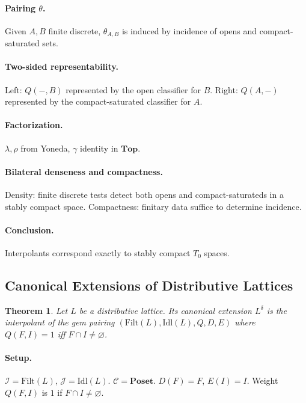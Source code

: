 \documentclass[11pt]{article}
\theoremstyle{plain}
\newtheorem{theorem}{Theorem}[section]
\theoremstyle{definition}
\theoremstyle{remark}
\begin{document}
\paragraph{Pairing $\theta$.}
Given $A,B$ finite discrete, $\theta_{A,B}$ is induced by incidence of opens and compact-saturated sets.

\paragraph{Two-sided representability.}
Left: $Q(-,B)$ represented by the open classifier for $B$.  
Right: $Q(A,-)$ represented by the compact-saturated classifier for $A$.

\paragraph{Factorization.}
$\lambda,\rho$ from Yoneda, $\gamma$ identity in $\mathbf{Top}$.

\paragraph{Bilateral denseness and compactness.}
Density: finite discrete tests detect both opens and compact-saturateds in a stably compact space.  
Compactness: finitary data suffice to determine incidence.

\paragraph{Conclusion.}
Interpolants correspond exactly to stably compact $T_{0}$ spaces.

\subsection{Canonical Extensions of Distributive Lattices}
\begin{theorem}
Let $L$ be a distributive lattice. Its canonical extension $L^{\delta}$ is the interpolant of the gem pairing $(\mathrm{Filt}(L),\mathrm{Idl}(L),Q,D,E)$ where $Q(F,I) = 1$ iff $F\cap I \neq \varnothing$.
\end{theorem}

\paragraph{Setup.}
$\mathcal{I}=\mathrm{Filt}(L)$, $\mathcal{J}=\mathrm{Idl}(L)$. $\mathcal{C}=\mathbf{Poset}$.  
$D(F)=F$, $E(I)=I$. Weight $Q(F,I)$ is $1$ if $F\cap I\neq\varnothing$.
\end{document}
